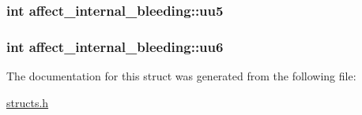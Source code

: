 \hypertarget{structaffect__internal__bleeding_a29bcc0465cb4664ddc088b2d6e9b54f8}{
\subsubsection[{uu5}]{\setlength{\rightskip}{0pt plus 5cm}int affect\-\_\-internal\-\_\-bleeding\-::uu5}}\label{structaffect__internal__bleeding_a29bcc0465cb4664ddc088b2d6e9b54f8}
\hypertarget{structaffect__internal__bleeding_ab9138c48b2d0b5498cf0b803262de54f}{
\subsubsection[{uu6}]{\setlength{\rightskip}{0pt plus 5cm}int affect\-\_\-internal\-\_\-bleeding\-::uu6}}\label{structaffect__internal__bleeding_ab9138c48b2d0b5498cf0b803262de54f}


The documentation for this struct was generated from the following file\-:\begin{DoxyCompactItemize}
\item 
\hyperlink{structs_8h}{structs.\-h}\end{DoxyCompactItemize}
